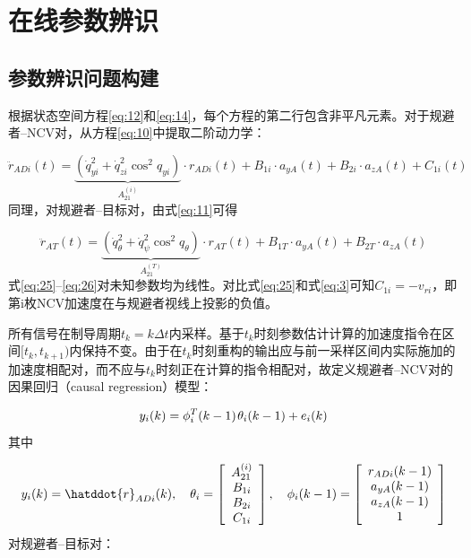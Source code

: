 \section{在线参数辨识}
\subsection{参数辨识问题构建}
根据状态空间方程\eqref{eq:12}和\eqref{eq:14}，每个方程的第二行包含非平凡元素。对于规避者–NCV对，从方程\eqref{eq:10}中提取二阶动力学：

\begin{equation}
\label{eq:25}
{\ddot r_{ADi}}(t) = \underbrace {(\dot q_{yi}^2 + \dot q_{zi}^2{{\cos }^2}{q_{yi}})}_{A_{21}^{(i)}} \cdot {r_{ADi}}(t) + {B_{1i}} \cdot {a_{yA}}(t) + {B_{2i}} \cdot {a_{zA}}(t) + {C_{1i}}(t)
\end{equation}
同理，对规避者–目标对，由式\eqref{eq:11}可得

\begin{equation}
\label{eq:26}
{\ddot r_{AT}}(t) = \underbrace {(\dot q_\theta ^2 + \dot q_\psi ^2{{\cos }^2}{q_\theta })}_{A_{21}^{(T)}} \cdot {r_{AT}}(t) + {B_{1T}} \cdot {a_{yA}}(t) + {B_{2T}} \cdot {a_{zA}}(t)
\end{equation}
式\eqref{eq:25}–\eqref{eq:26}对未知参数均为线性。对比式\eqref{eq:25}和式\eqref{eq:3}可知${C_{1i}} =  - {v_{ri}}$，即第i枚NCV加速度在与规避者视线上投影的负值。

所有信号在制导周期${t_k} = k\Delta t$内采样。基于${t_k}$时刻参数估计计算的加速度指令在区间$[{t_k},{t_{k + 1}})$内保持不变。由于在${t_k}$时刻重构的输出应与前一采样区间内实际施加的加速度相配对，而不应与${t_k}$时刻正在计算的指令相配对，故定义规避者–NCV对的因果回归（causal regression）模型：

\begin{equation}
\label{eq:27}
{y_i}(k) = \phi _i^T(k - 1){\kern 1pt} {\theta _i}(k - 1) + {e_i}(k)
\end{equation}
其中

\begin{equation}
\label{eq:28}
{y_i}(k) = \hatddot{r}_{ADi}(k),\quad {\theta _i} = \left[ {\begin{array}{*{20}{c}}
  {A_{21}^{(i)}} \\ 
  {{B_{1i}}} \\ 
  {{B_{2i}}} \\ 
  {{C_{1i}}} 
\end{array}} \right],\quad {\phi _i}(k - 1) = \left[ {\begin{array}{*{20}{c}}
  {{r_{ADi}}(k - 1)} \\ 
  {{a_{yA}}(k - 1)} \\ 
  {{a_{zA}}(k - 1)} \\ 
  1 
\end{array}} \right]
\end{equation}
对规避者–目标对：


